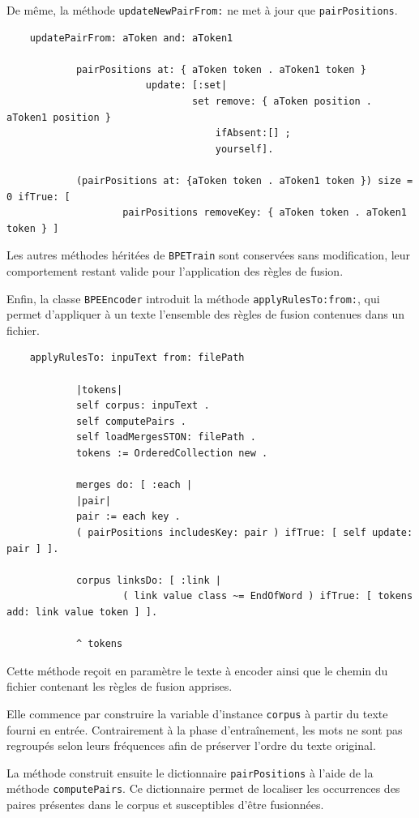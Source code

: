\documentclass[12pt,a4paper]{report}
\begin{document}
	De même, la méthode \texttt{updateNewPairFrom:} ne met à jour que \texttt{pairPositions}.
	
	\begin{verbatim}
	updatePairFrom: aToken and: aToken1
	
			pairPositions at: { aToken token . aToken1 token }
						update: [:set|
								set remove: { aToken position . aToken1 position }
									ifAbsent:[] ;
									yourself].
									
			(pairPositions at: {aToken token . aToken1 token }) size = 0 ifTrue: [
					pairPositions removeKey: { aToken token . aToken1 token } ]
	\end{verbatim}
	
	Les autres méthodes héritées de \texttt{BPETrain} sont conservées sans modification, leur comportement restant valide pour l'application des règles de fusion.
	
	Enfin, la classe \texttt{BPEEncoder} introduit la méthode \texttt{applyRulesTo:from:}, qui permet d'appliquer à un texte l'ensemble des règles de fusion contenues dans un fichier.
	
	\begin{verbatim}
	applyRulesTo: inpuText from: filePath
	
			|tokens|
			self corpus: inpuText .
			self computePairs .
			self loadMergesSTON: filePath .
			tokens := OrderedCollection new .
			
			merges do: [ :each |
			|pair|
			pair := each key .
			( pairPositions includesKey: pair ) ifTrue: [ self update: pair ] ].
			
			corpus linksDo: [ :link |
					( link value class ~= EndOfWord ) ifTrue: [ tokens add: link value token ] ].
					
			^ tokens
	\end{verbatim}
	
	Cette méthode reçoit en paramètre le texte à encoder ainsi que le chemin du fichier contenant les règles de fusion apprises.
	
	Elle commence par construire la variable d'instance \texttt{corpus} à partir du texte fourni en entrée. Contrairement à la phase d'entraînement, les mots ne sont pas regroupés selon leurs fréquences afin de préserver l'ordre du texte original.
	
	La méthode construit ensuite le dictionnaire \texttt{pairPositions} à l'aide de la méthode \texttt{computePairs}. Ce dictionnaire permet de localiser les occurrences des paires présentes dans le corpus et susceptibles d'être fusionnées.
	
\end{document}
